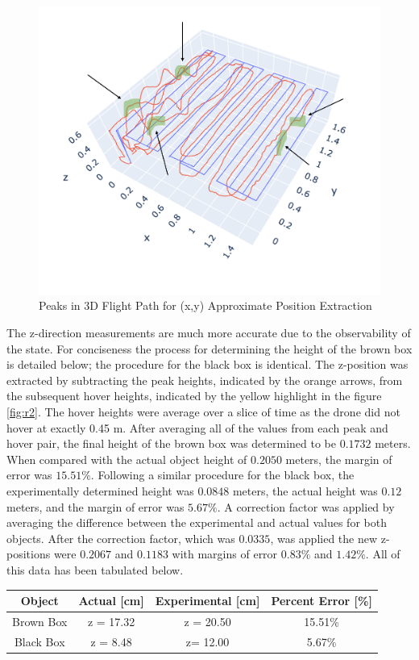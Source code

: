 \begin{figure}[H]
  \centering
  \includegraphics[width=0.8\linewidth]{R&D/r1.png}  
  \caption{Peaks in 3D Flight Path for (x,y) Approximate Position Extraction}
  \label{fig:r1}
\end{figure}

The z-direction measurements are much more accurate due to the observability of the state. For conciseness the process for determining the height of the brown box is detailed below; the procedure for the black box is identical. The z-position was extracted by subtracting the peak heights, indicated by the orange arrows, from the subsequent hover heights, indicated by the yellow highlight in the figure \ref{fig:r2}. The hover heights were average over a slice of time as the drone did not hover at exactly 0.45 m. After averaging all of the values from each peak and hover pair, the final height of the brown box was determined to be $0.1732$ meters. When compared with the actual object height of $0.2050$ meters, the margin of error was $15.51\%$. Following a similar procedure for the black box, the experimentally determined height was $0.0848$ meters, the actual height was $0.12$ meters, and the margin of error was $5.67\%$. A correction factor was applied by averaging the difference between the experimental and actual values for both objects. After the correction factor, which was $0.0335$, was applied the new z-positions were $0.2067$ and $0.1183$ with margins of error $0.83 \%$ and $1.42 \%$. All of this data has been tabulated below.

\begin{center}

    \begin{tabular}{|c|c|c|c|}
        \rowcolor{lightgray} 
        \hline
        \textbf{Object} & \textbf{Actual [cm]} & \textbf{Experimental [cm]} & \textbf{Percent Error [\%]} \\
        \hline
        Brown Box & z = 17.32 & z = 20.50 & 15.51\%\\
        \hline
        Black Box & z = 8.48 & z= 12.00 &5.67\% \\
        \hline
\end{tabular}
\end{center}

